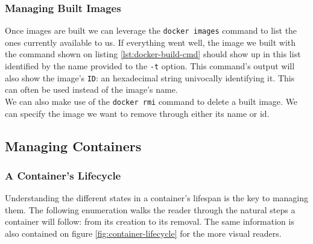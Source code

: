             \subsubsection{Managing Built Images}
                Once images are built we can leverage the \texttt{docker images} command to list the ones currently available to us. If everything went well, the image we built with the command shown on listing \ref{lst:docker-build-cmd} should show up in this list identified by the name provided to the \texttt{-t} option. This command's output will also show the image's \texttt{ID}: an hexadecimal string univocally identifying it. This can often be used instead of the image's name.\\

                We can also make use of the \texttt{docker rmi} command to delete a built image. We can specify the image we want to remove through either its name or id.\\

        \subsection{Managing Containers}
            \subsubsection{A Container's Lifecycle}
                Understanding the different states in a container's lifespan is the key to managing them. The following enumeration walks the reader through the natural steps a container will follow: from its creation to its removal. The same information is also contained on figure \ref{fig:container-lifecycle} for the more visual readers.\\

